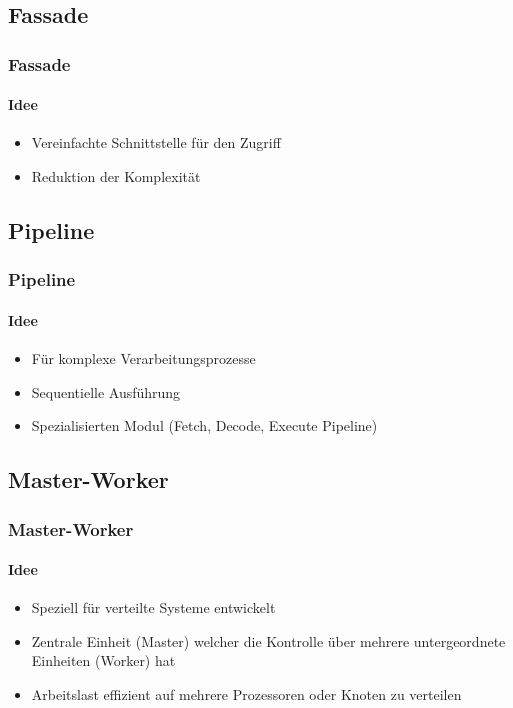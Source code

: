 \subsection{Fassade}
\begin{frame}
  \frametitle{Fassade}
  \framesubtitle{Idee}
  \begin{itemize}
    \item Vereinfachte Schnittstelle für den Zugriff 
    \item Reduktion der Komplexität
  \end{itemize}
\end{frame}


\subsection{Pipeline}
\begin{frame}
  \frametitle{Pipeline}
  \framesubtitle{Idee}
  \begin{itemize}
    \item Für komplexe Verarbeitungsprozesse
    \item Sequentielle Ausführung
    \item Spezialisierten Modul (Fetch, Decode, Execute Pipeline)
  \end{itemize}
\end{frame}

\subsection{Master-Worker}
\begin{frame}
  \frametitle{Master-Worker}
  \framesubtitle{Idee}
  \begin{itemize}
    \item Speziell für verteilte Systeme entwickelt
    \item Zentrale Einheit (Master) welcher die Kontrolle über mehrere untergeordnete Einheiten (Worker) hat
    \item Arbeitslast effizient auf mehrere Prozessoren oder Knoten zu verteilen
  \end{itemize}
\end{frame}